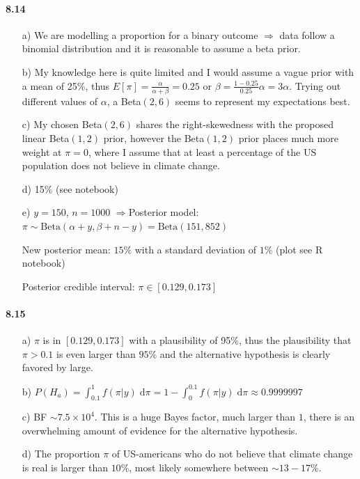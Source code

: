 \documentclass[fontsize=11pt,DIV=18,parskip=half]{scrartcl}
\begin{document}
\paragraph{8.14}

\begin{enumerate}
\item[a)] We are modelling a proportion for a binary outcome $\Rightarrow$ data follow a binomial distribution and it is reasonable to assume a beta prior.
\item[b)] My knowledge here is quite limited and I would assume a vague prior with a mean of 25\%, thus $E[\pi] = \frac{\alpha}{\alpha+\beta} = 0.25$ or $\beta = \frac{1-0.25}{0.25} \alpha = 3\alpha$. Trying out different values of $\alpha$, a Beta$(2,6)$ seems to represent my expectations best.
\item[c)] My chosen Beta$(2,6)$ shares the right-skewedness with the proposed linear Beta$(1,2)$ prior, however the Beta$(1,2)$ prior places much more weight at $\pi=0$, where I assume that at least a percentage of the US population does not believe in climate change.
\item[d)] 15\% (see notebook)
\item[e)] $y=150$, $n=1000$ \quad$\Rightarrow$\quad Posterior model: $\pi \sim \text{Beta}(\alpha + y, \beta+n-y) = \text{Beta}(151, 852)$
		 
		 New posterior mean: $15\%$ with a standard deviation of $1\%$ (plot see R notebook)
		 
		 Posterior credible interval: $\pi \in [0.129, 0.173]$
\end{enumerate}

\paragraph{8.15}

\begin{enumerate}
\item[a)] $\pi$ is in $[0.129, 0.173]$ with a plausibility of 95\%, thus the plausibility that $\pi > 0.1$ is even larger than $95\%$ and the alternative hypothesis is clearly favored by large.
\item[b)] $P(H_a) = \int_{0.1}^1 f(\pi|y) \; \text{d}\pi = 1-\int_{0}^{0.1} f(\pi|y) \; \text{d}\pi \approx 0.9999997$
\item[c)] BF $\sim 7.5 \times 10^4$. This is a huge Bayes factor, much larger than $1$, there is an overwhelming amount of evidence for the alternative hypothesis.
\item[d)] The proportion $\pi$ of US-americans who do not believe that climate change is real is larger than $10\%$, most likely somewhere between $\sim13-17\%$.
\end{enumerate}
\end{document}

